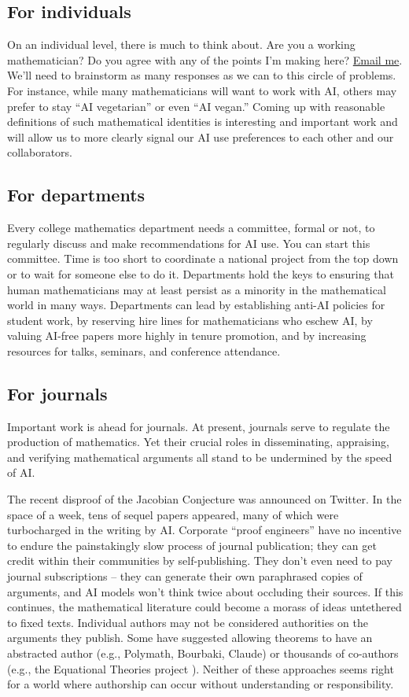 \documentclass[12pt]{amsart}
\theoremstyle{definition}
\begin{document}
\subsection*{For individuals}
On an individual level, there is much to think about. Are you a working mathematician? Do you agree with any of the points I'm making here? \href{mailto:maxhweinreich@gmail.com}{Email me}. We'll need to brainstorm as many responses as we can to this circle of problems. For instance, while many mathematicians will want to work with AI, others may prefer to stay “AI vegetarian” or even “AI vegan.” Coming up with reasonable definitions of such mathematical identities is interesting and important work and will allow us to more clearly signal our AI use preferences to each other and our collaborators.

\subsection*{For departments}
Every college mathematics department needs a committee, formal or not, to regularly discuss and make recommendations for AI use. You can start this committee. Time is too short to coordinate a national project from the top down or to wait for someone else to do it. Departments hold the keys to ensuring that human mathematicians may at least persist as a minority in the mathematical world in many ways. Departments can lead by establishing anti-AI policies for student work, by reserving hire lines for mathematicians who eschew AI, by valuing AI-free papers more highly in tenure promotion, and by increasing resources for talks, seminars, and conference attendance.

\subsection*{For journals}

Important work is ahead for journals. At present, journals serve to regulate the production of mathematics. Yet their crucial roles in disseminating, appraising, and verifying mathematical arguments all stand to be undermined by the speed of AI.

The recent disproof of the Jacobian Conjecture was announced on Twitter. In the space of a week, tens of sequel papers appeared, many of which were turbocharged in the writing by AI. Corporate ``proof engineers'' have no incentive to endure the painstakingly slow process of journal publication; they can get credit within their communities by self-publishing. They don’t even need to pay journal subscriptions – they can generate their own paraphrased copies of arguments, and AI models won’t think twice about occluding their sources. If this continues, the mathematical literature could become a morass of ideas untethered to fixed texts. Individual authors may not be considered authorities on the arguments they publish. Some have suggested allowing theorems to have an abstracted author (e.g., Polymath, Bourbaki, Claude) or thousands of co-authors (e.g., the Equational Theories project \cite{bolan2025equationaltheoriesprojectadvancing}). Neither of these approaches seems right for a world where authorship can occur without understanding or responsibility.
\end{document}
